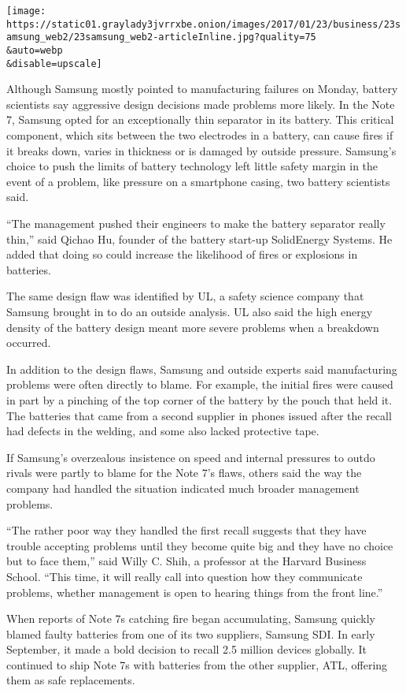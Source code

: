 \texttt{[image: https://static01.graylady3jvrrxbe.onion/images/2017/01/23/business/23samsung\_web2/23samsung\_web2-articleInline.jpg?quality=75\\\&auto=webp\\\&disable=upscale]}

Although Samsung mostly pointed to manufacturing failures on Monday,
battery scientists say aggressive design decisions made problems more
likely. In the Note 7, Samsung opted for an exceptionally thin separator
in its battery. This critical component, which sits between the two
electrodes in a battery, can cause fires if it breaks down, varies in
thickness or is damaged by outside pressure. Samsung's choice to push
the limits of battery technology left little safety margin in the event
of a problem, like pressure on a smartphone casing, two battery
scientists said.

``The management pushed their engineers to make the battery separator
really thin,'' said Qichao Hu, founder of the battery start-up
SolidEnergy Systems. He added that doing so could increase the
likelihood of fires or explosions in batteries.

The same design flaw was identified by UL, a safety science company that
Samsung brought in to do an outside analysis. UL also said the high
energy density of the battery design meant more severe problems when a
breakdown occurred.

In addition to the design flaws, Samsung and outside experts said
manufacturing problems were often directly to blame. For example, the
initial fires were caused in part by a pinching of the top corner of the
battery by the pouch that held it. The batteries that came from a second
supplier in phones issued after the recall had defects in the welding,
and some also lacked protective tape.

If Samsung's overzealous insistence on speed and internal pressures to
outdo rivals were partly to blame for the Note 7's flaws, others said
the way the company had handled the situation indicated much broader
management problems.

``The rather poor way they handled the first recall suggests that they
have trouble accepting problems until they become quite big and they
have no choice but to face them,'' said Willy C. Shih, a professor at
the Harvard Business School. ``This time, it will really call into
question how they communicate problems, whether management is open to
hearing things from the front line.''

When reports of Note 7s catching fire began accumulating, Samsung
quickly blamed faulty batteries from one of its two suppliers, Samsung
SDI. In early September, it made a bold decision to recall 2.5 million
devices globally. It continued to ship Note 7s with batteries from the
other supplier, ATL, offering them as safe replacements.

